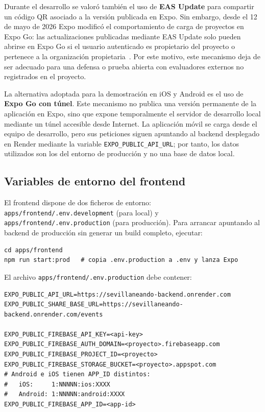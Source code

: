 Durante el desarrollo se valoró también el uso de \textbf{EAS Update} para compartir un código QR asociado a la versión publicada en Expo. Sin embargo, desde el 12 de mayo de 2026 Expo modificó el comportamiento de carga de proyectos en Expo Go: las actualizaciones publicadas mediante EAS Update solo pueden abrirse en Expo Go si el usuario autenticado es propietario del proyecto o pertenece a la organización propietaria~\cite{expoGoLoading2026}. Por este motivo, este mecanismo deja de ser adecuado para una defensa o prueba abierta con evaluadores externos no registrados en el proyecto.

La alternativa adoptada para la demostración en iOS y Android es el uso de \textbf{Expo Go con túnel}. Este mecanismo no publica una versión permanente de la aplicación en Expo, sino que expone temporalmente el servidor de desarrollo local mediante un túnel accesible desde Internet. La aplicación móvil se carga desde el equipo de desarrollo, pero sus peticiones siguen apuntando al backend desplegado en Render mediante la variable \texttt{EXPO\_PUBLIC\_API\_URL}; por tanto, los datos utilizados son los del entorno de producción y no una base de datos local.

\subsection{Variables de entorno del frontend}

El frontend dispone de dos ficheros de entorno: \texttt{apps/frontend/.env.development} (para local) y \texttt{apps/frontend/.env.production} (para producción). Para arrancar apuntando al backend de producción sin generar un build completo, ejecutar:

\begin{lstlisting}
cd apps/frontend
npm run start:prod   # copia .env.production a .env y lanza Expo
\end{lstlisting}

El archivo \texttt{apps/frontend/.env.production} debe contener:

\begin{lstlisting}
EXPO_PUBLIC_API_URL=https://sevillaneando-backend.onrender.com
EXPO_PUBLIC_SHARE_BASE_URL=https://sevillaneando-backend.onrender.com/events

EXPO_PUBLIC_FIREBASE_API_KEY=<api-key>
EXPO_PUBLIC_FIREBASE_AUTH_DOMAIN=<proyecto>.firebaseapp.com
EXPO_PUBLIC_FIREBASE_PROJECT_ID=<proyecto>
EXPO_PUBLIC_FIREBASE_STORAGE_BUCKET=<proyecto>.appspot.com
# Android e iOS tienen APP_ID distintos:
#   iOS:     1:NNNNN:ios:XXXX
#   Android: 1:NNNNN:android:XXXX
EXPO_PUBLIC_FIREBASE_APP_ID=<app-id>
\end{lstlisting}

